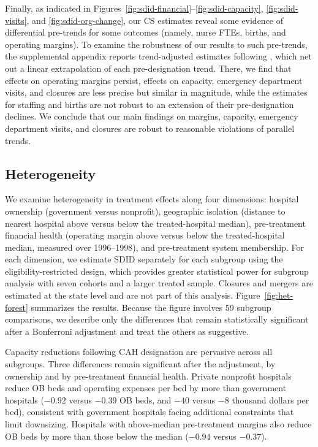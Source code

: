 \documentclass[a4paper, 12pt, twoside]{article}
\begin{document}
Finally, as indicated in Figures~\ref{fig:sdid-financial}--\ref{fig:sdid-capacity}, \ref{fig:sdid-visits}, and \ref{fig:sdid-org-change}, our CS estimates reveal some evidence of differential pre-trends for some outcomes (namely, nurse FTEs, births, and operating margins). To examine the robustness of our results to such pre-trends, the supplemental appendix reports trend-adjusted estimates following \citet{rambachan2023}, which net out a linear extrapolation of each pre-designation trend. There, we find that effects on operating margins persist, effects on capacity, emergency department visits, and closures are less precise but similar in magnitude, while the estimates for staffing and births are not robust to an extension of their pre-designation declines. We conclude that our main findings on margins, capacity, emergency department visits, and closures are robust to reasonable violations of parallel trends.


\subsection{Heterogeneity}
\label{sec:heterogeneity}

We examine heterogeneity in treatment effects along four dimensions: hospital ownership (government versus nonprofit), geographic isolation (distance to nearest hospital above versus below the treated-hospital median), pre-treatment financial health (operating margin above versus below the treated-hospital median, measured over 1996--1998), and pre-treatment system membership. For each dimension, we estimate SDID separately for each subgroup using the eligibility-restricted design, which provides greater statistical power for subgroup analysis with seven cohorts and a larger treated sample. Closures and mergers are estimated at the state level and are not part of this analysis. Figure~\ref{fig:het-forest} summarizes the results. Because the figure involves 59 subgroup comparisons, we describe only the differences that remain statistically significant after a Bonferroni adjustment and treat the others as suggestive.

Capacity reductions following CAH designation are pervasive across all subgroups. Three differences remain significant after the adjustment, by ownership and by pre-treatment financial health. Private nonprofit hospitals reduce OB beds and operating expenses per bed by more than government hospitals ($-0.92$ versus $-0.39$ OB beds, and $-40$ versus $-8$ thousand dollars per bed), consistent with government hospitals facing additional constraints that limit downsizing. Hospitals with above-median pre-treatment margins also reduce OB beds by more than those below the median ($-0.94$ versus $-0.37$).
\end{document}
